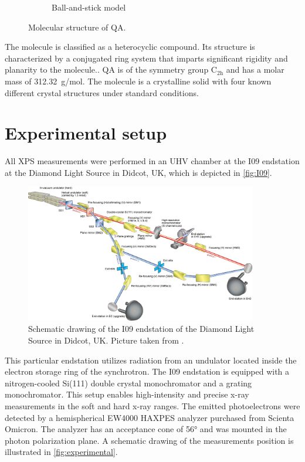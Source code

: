 \begin{figure}[H]
\begin{subfigure}[b]{0.48\linewidth}
		\caption{Ball-and-stick model}
	\end{subfigure}
	\caption{Molecular structure of \acf{QA}.}
	\label{fig:QA}
\end{figure}


The molecule is classified as a heterocyclic compound. Its structure is characterized by a conjugated ring system that imparts significant rigidity and planarity to the molecule.\autocite{forBiotechnologyInformation2025}. \ac{QA} is of the symmetry group $\mathrm{C_{2h}}$ and has a molar mass of 312.32~\si{g/mol}. The molecule is a crystalline solid with four known different crystal structures under standard conditions.\autocite{Paulus2007,Mizuguchi}

\newpage
\section{Experimental setup}

All \ac{XPS} measurements were performed in an \ac{UHV} chamber at the I09 endstation at the Diamond Light Source in Didcot, UK, which is depicted in \autoref{fig:I09}.

\begin{figure}[htbp]
	\centering
	\includegraphics[width=0.9\textwidth]{images/I09.jpg}
	\caption{Schematic drawing of the I09 endstation of the Diamond Light Source in Didcot, UK. Picture taken from \cite{Diamond2025}.}
	\label{fig:I09}
\end{figure}

 This particular endstation utilizes radiation from an undulator located inside the electron storage ring of the synchrotron. The I09 endstation is equipped with a nitrogen-cooled Si(111) double crystal monochromator and a grating monochromator. This setup enables high-intensity and precise x-ray measurements in the soft and hard x-ray ranges. The emitted photoelectrons were detected by a hemispherical EW4000 HAXPES analyzer purchased from Scienta Omicron. The analyzer has an acceptance cone of 56\si{\degree} and was mounted in the photon polarization plane.\autocite{Diamond2025} A schematic drawing of the measurements position is illustrated in \autoref{fig:experimental}.

